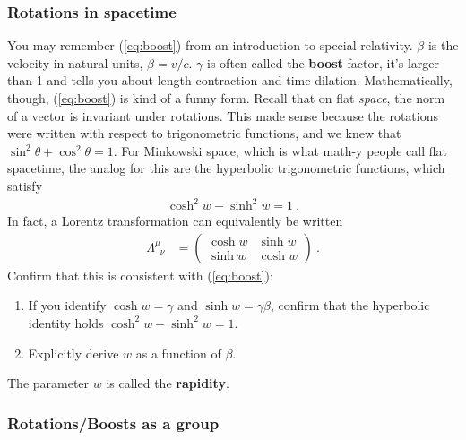 \documentclass[12pt]{article}
\begin{document}
\subsubsection{Rotations in spacetime}

You may remember (\ref{eq:boost}) from an introduction to special relativity. $\beta$ is the velocity in natural units, $\beta = v/c$. $\gamma$ is often called the \textbf{boost} factor, it's larger than 1 and tells you about length contraction and time dilation. Mathematically, though, (\ref{eq:boost}) is kind of a funny form. Recall that on flat \emph{space}, the norm of a vector is invariant under rotations. This made sense because the rotations were written with respect to trigonometric functions, and we knew that $\sin^2\theta + \cos^2\theta = 1$. For Minkowski space, which is what math-y people call flat spacetime, the analog for this are the hyperbolic trigonometric functions, which satisfy
\begin{align}
	\cosh^2 w - \sinh^2 w = 1 \ . 
\end{align}
In fact, a Lorentz transformation can equivalently be written
\begin{align}
		\Lambda^\mu_{\phantom \mu \nu} &= 
	\begin{pmatrix}
		\cosh w & \sinh w
		\\
		\sinh w & \cosh w
	\end{pmatrix}
\ .
\end{align}
Confirm that this is consistent with (\ref{eq:boost}):
\begin{enumerate}
	\item If you identify $\cosh w = \gamma$ and $\sinh w = \gamma\beta$, confirm that the hyperbolic identity holds $\cosh^2 w - \sinh^2 w = 1$.
	\item Explicitly derive $w$ as a function of $\beta$.
\end{enumerate}
The parameter $w$ is called the \textbf{rapidity}.

\subsubsection{Rotations/Boosts as a group}
\end{document}
